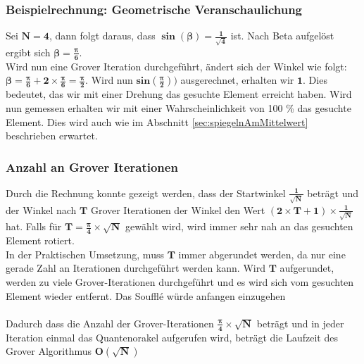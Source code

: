 \subsubsection{Beispielrechnung: Geometrische Veranschaulichung}
Sei $\mathbf{N=4}$, dann folgt daraus, dass $\mathbf{\sin(\beta) = \frac{1}{\sqrt{4}}}$ ist. Nach Beta aufgelöst ergibt sich $\mathbf{\beta = \frac{\pi}{6}}$.
\\
Wird nun eine Grover Iteration durchgeführt, ändert sich der Winkel wie folgt: $\mathbf{\beta = \frac{\pi}{6} + 2 \times \frac{\pi}{6}  = \frac{\pi}{2}}$. Wird nun $\mathbf{sin(\frac{\pi}{2}))}$ ausgerechnet, erhalten wir $\mathbf{1}$. Dies bedeutet, das wir mit einer Drehung das gesuchte Element erreicht haben. Wird nun gemessen erhalten wir mit einer Wahrscheinlichkeit von 100 \% das gesuchte Element. Dies wird auch wie im Abschnitt  \ref{sec:spiegelnAmMittelwert}  beschrieben erwartet.

\subsubsection{Anzahl an Grover Iterationen}
Durch die Rechnung konnte gezeigt werden, dass der Startwinkel $\mathbf{\frac{1}{\sqrt{N}}}$ beträgt und der Winkel nach $\mathbf{T}$ Grover Iterationen der Winkel den Wert $\mathbf{(2 \times T + 1)\times \frac{1}{\sqrt{N}}}$ hat. 
Falls für $\mathbf{T = \frac{\pi}{4}\times \sqrt{N}}$ gewählt wird, wird immer sehr nah an das gesuchten Element rotiert. 
\\
In der Praktischen Umsetzung, muss $\mathbf{T}$ immer abgerundet werden, da nur eine gerade Zahl an Iterationen durchgeführt werden kann. Wird $\mathbf{T}$ aufgerundet, werden zu viele Grover-Iterationen durchgeführt und es wird sich vom gesuchten Element wieder entfernt. \cite[S. 157]{KLM07} Das Souffl\'{e} würde anfangen einzugehen
\\
\\
Dadurch dass die Anzahl der Grover-Iterationen $\mathbf{ \frac{\pi}{4}\times \sqrt{N}}$ beträgt und in jeder Iteration einmal das Quantenorakel aufgerufen wird, beträgt die Laufzeit des Grover Algorithmus $\mathbf{O(\sqrt N)}$
